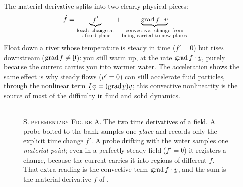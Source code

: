 \begin{remark}\label{rem:convective}
The material derivative splits into two clearly physical pieces:
\[
   \dot f=\underbrace{f'}_{\substack{\text{local: change at}\\ \text{a fixed place}}}
   +\underbrace{\ip{\grad f}{\bv}}_{\substack{\text{convective: change from}\\
   \text{being carried to new places}}}.
\]
Float down a river whose temperature is steady in time ($f'=0$) but rises
downstream ($\grad f\neq\bze$): you still warm up, at the rate
$\ip{\grad f}{\bv}$, purely because the current carries you into warmer
water. The acceleration  shows the same effect is why steady flows
($\bv'=\bze$) can still accelerate fluid particles, through the nonlinear
term $\bL\bv=(\grad\bv)\bv$; this convective nonlinearity is the source of
most of the difficulty in fluid and solid dynamics.
\end{remark}

\begin{figure}[htbp]\centering
{}
\\[1.8ex]
{\footnotesize\textsc{Supplementary Figure A.} The two time derivatives of a
field. A probe bolted to the bank samples one \emph{place} and records only
the explicit time change $f'$. A probe drifting with the water samples one
\emph{material point}; even in a perfectly steady field ($f'=0$) it registers
a change, because the current carries it into regions of different $f$. That
extra reading is the convective term $\ip{\grad f}{\bv}$, and the sum is the
material derivative $\dot f$ of .}
\end{figure}

